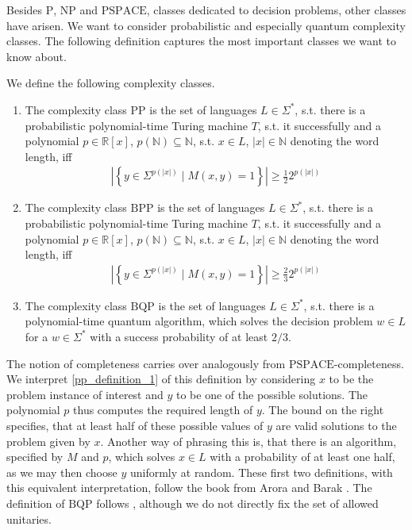 Besides \(\text{P}\), \(\text{NP}\) and \(\text{PSPACE}\), classes dedicated to decision problems, other classes have arisen. We want to consider probabilistic and especially quantum complexity classes. The following definition captures the most important classes we want to know about.
\begin{definition}
    We define the following complexity classes.
    \begin{enumerate}[label=(\roman*)]
        \item \label{pp_definition_1} The complexity class \(\text{PP}\) is the set of languages \(L \in \Sigma^*\), s.t. there is a probabilistic polynomial-time Turing machine \(T\), s.t. it successfully and a polynomial \(p \in \mathbb{R}[x]\), \(p(\mathbb{N}) \subseteq \mathbb{N}\), s.t. \(x \in L\), \(|x| \in \mathbb{N}\) denoting the word length, iff
        \begin{align}
            \left|\left\{y \in \Sigma^{p(|x|)} \mid M(x, y) = 1\right\}\right| \geq \frac{1}{2} 2^{p(|x|)}
        \end{align}
        \item The complexity class \(\text{BPP}\) is the set of languages \(L \in \Sigma^*\), s.t. there is a probabilistic polynomial-time Turing machine \(T\), s.t. it successfully and a polynomial \(p \in \mathbb{R}[x]\), \(p(\mathbb{N}) \subseteq \mathbb{N}\), s.t. \(x \in L\), \(|x| \in \mathbb{N}\) denoting the word length, iff
        \begin{align}
            \left|\left\{y \in \Sigma^{p(|x|)} \mid M(x, y) = 1\right\}\right| \geq \frac{2}{3} 2^{p(|x|)}
        \end{align}
        \item The complexity class \(\text{BQP}\) is the set of languages \(L \in \Sigma^*\), s.t. there is a polynomial-time quantum algorithm, which solves the decision problem \(w \in L\) for a \(w \in \Sigma^*\) with a success probability of at least \(2/3\).
    \end{enumerate}
\end{definition}
The notion of completeness carries over analogously from \(\text{PSPACE}\)-completeness. We interpret \ref{pp_definition_1} of this definition by considering \(x\) to be the problem instance of interest and \(y\) to be one of the possible solutions. The polynomial \(p\) thus computes the required length of \(y\). The bound on the right specifies, that at least half of these possible values of \(y\) are valid solutions to the problem given by \(x\). Another way of phrasing this is, that there is an algorithm, specified by \(M\) and \(p\), which solves \(x \in L\) with a probability of at least one half, as we may then choose \(y\) uniformly at random. These first two definitions, with this equivalent interpretation, follow the book from Arora and Barak \cite[p. 173, pp. 116-117]{Barak2007}. The definition of \(\text{BQP}\) follows \cite[p. 412]{Barak2007}, although we do not directly fix the set of allowed unitaries.

